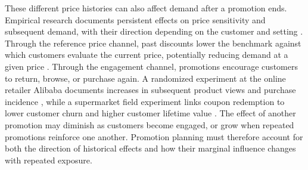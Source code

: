 These different price histories can also affect demand after a promotion ends. Empirical research documents persistent effects on price sensitivity and subsequent demand, with their direction depending on the customer and setting \citep{anderson2004,mela1997longterm,neslin2009dynamics}. Through the reference price channel, past discounts lower the benchmark against which customers evaluate the current price, potentially reducing demand at a given price \citep{winer1986reference,mazumdar2005reference}. Through the engagement channel, promotions encourage customers to return, browse, or purchase again. A randomized experiment at the online retailer Alibaba documents increases in subsequent product views and purchase incidence \citep{dai2020alibaba}, while a supermarket field experiment links coupon redemption to lower customer churn and higher customer lifetime value \citep{tsujikawa2025coupon}. The effect of another promotion may diminish as customers become engaged, or grow when repeated promotions reinforce one another. Promotion planning must therefore account for both the direction of historical effects and how their marginal influence changes with repeated exposure.
\par\endgroup

